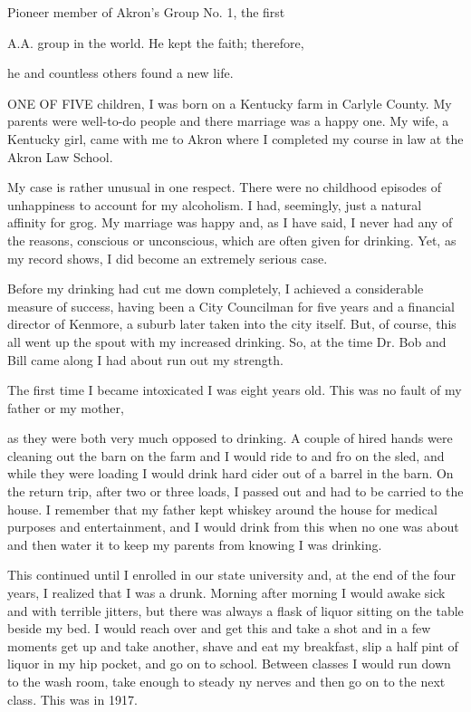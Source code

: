 
\begin{biblechapter}
    Pioneer member of Akron’s Group No. 1, the first

A.A. group in the world. He kept the faith; therefore,

he and countless others found a new life.

      ONE OF FIVE children, I was born on a Kentucky farm in Carlyle County. My parents were well-to-do people and there marriage was a happy one. My wife, a Kentucky girl, came with me to Akron where I completed my course in law at the Akron Law School.

My case is rather unusual in one respect. There were no childhood episodes of unhappiness to account for my alcoholism. I had, seemingly, just a natural affinity for grog. My marriage was happy and, as I have said, I never had any of the reasons, conscious or unconscious, which are often given for drinking. Yet, as my record shows, I did become an extremely serious case.

Before my drinking had cut me down completely, I achieved a considerable measure of success, having been a City Councilman for five years and a financial director of Kenmore, a suburb later taken into the city itself. But, of course, this all went up the spout with my increased drinking. So, at the time Dr. Bob and Bill came along I had about run out my strength.

The first time I became intoxicated I was eight years old. This was no fault of my father or my mother,

as they were both very much opposed to drinking. A couple of hired hands were cleaning out the barn on the farm and I would ride to and fro on the sled, and while they were loading I would drink hard cider out of a barrel in the barn. On the return trip, after two or three loads, I passed out and had to be carried to the house. I remember that my father kept whiskey around the house for medical purposes and entertainment, and I would drink from this when no one was about and then water it to keep my parents from knowing I was drinking.

This continued until I enrolled in our state university and, at the end of the four years, I realized that I was a drunk. Morning after morning I would awake sick and with terrible jitters, but there was always a flask of liquor sitting on the table beside my bed. I would reach over and get this and take a shot and in a few moments get up and take another, shave and eat my breakfast, slip a half pint of liquor in my hip pocket, and go on to school. Between classes I would run down to the wash room, take enough to steady ny nerves and then go on to the next class. This was in 1917.


\end{biblechapter}
